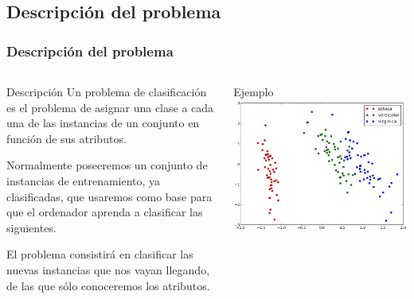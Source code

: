 \documentclass{beamer}
\begin{document}
\subsection{Descripción del problema}
  \begin{frame}
    \frametitle{Descripción del problema}
    \begin{columns}[T]
    
     \begin{column}{.5\textwidth}
      \begin{block}{Descripción}
       Un problema de clasificación es el problema de asignar una clase a cada una de
       las instancias de un conjunto en función de sus atributos.
       
       Normalmente poseeremos un conjunto de instancias de entrenamiento, ya clasificadas, que
       usaremos como base para que el ordenador aprenda a clasificar las siguientes.

       El problema consistirá en clasificar las nuevas instancias que nos vayan
       llegando, de las que sólo conoceremos los atributos.
      \end{block}
     \end{column}
     
     \begin{column}{.5\textwidth}
      \begin{block}{Ejemplo}
       \includegraphics[width=\textwidth]{imgs/plot_iris.png}
      \end{block}
     \end{column}
     
    \end{columns}

  \end{frame}
\end{document}
